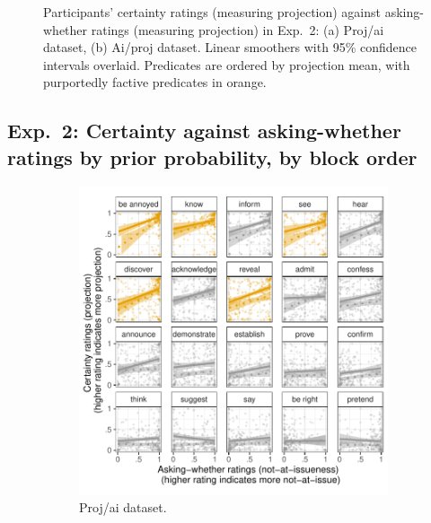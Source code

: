 \documentclass[11pt,fleqn]{article}
\newcommand{\6}{\mbox{$[\hspace*{-.6mm}[$}}
\newcommand{\9}{\mbox{$]\hspace*{-.6mm}]$}}
\begin{document}
\begin{figure}[h!]
  
\caption{Participants' certainty ratings (measuring projection) against asking-whether ratings (measuring projection) in Exp.~2: (a) Proj/ai dataset, (b) Ai/proj dataset. Linear smoothers with 95\% confidence intervals overlaid. Predicates are ordered by projection mean, with purportedly factive predicates in orange.}
\end{figure}

\newpage

\subsection{Exp.~2: Certainty against asking-whether ratings by prior probability, by block order}

\begin{figure}[h!]
\centering
\begin{subfigure}[t]{0.49\textwidth}
\centering
\includegraphics[width=.9\textwidth]{../../results/exp2/graphs/SUP-projai-projection-by-ai-and-prior}
\caption{Proj/ai dataset.}
\end{subfigure} \hfill \begin{subfigure}[t]{0.49\textwidth}
\centering

\end{subfigure}
\end{figure}
\end{document}
